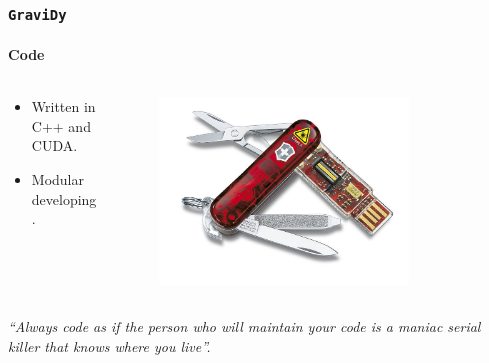 \begin{frame}
    \frametitle{\texttt{GraviDy}}
    \framesubtitle{Code}
    \begin{columns}
        \begin{column}{0.5\textwidth}
            \begin{itemize}
                \item Written in C++ and CUDA.
                \item Modular developing.
            \end{itemize}
        \end{column}
        \begin{column}{0.5\textwidth}
            \begin{figure}
                \centering
                \label{fig:navaja}
                \includegraphics[width=0.8\textwidth]{img/navaja}
            \end{figure}
        \end{column}
    \end{columns}
    \begin{center}
        \small{
        \emph{``Always code as if the person who will maintain your code is a
        maniac serial killer that knows where you live''.}
        }
    \end{center}
\end{frame}

